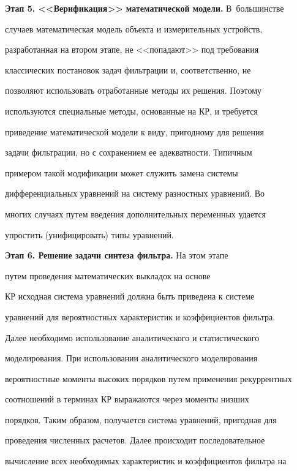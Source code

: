 \smallskip


\textbf{\bf Этап 5. <<Верификация>> математической модели.} В~большинстве


случаев математическая модель объекта и измерительных  устройств,


разработанная на втором этапе, не <<попадают>> под требования


классических постановок задач фильтрации и, соответственно, не


позволяют использовать отработанные методы их решения. Поэтому


используются специальные методы, основанные на КР,  и  требуется


приведение математической модели к виду, пригодному для решения


задачи фильтрации, но с сохранением ее адекватности. Типичным


примером такой модификации может служить замена системы


дифференциальных уравнений на систему разностных уравнений. Во


многих случаях путем введения дополнительных переменных удается


упростить (унифицировать) типы уравнений.





\smallskip


\textbf{Этап 6. Решение задачи синтеза фильтра.} На этом этапе 


путем проведения математических выкладок на основе


КР исходная система уравнений должна быть приведена к системе


уравнений для вероятностных характеристик и коэффициентов фильтра.


Далее необходимо  использование аналитического и статистического


моделирования. При использовании аналитического моделирования


вероятностные моменты высоких порядков путем применения рекуррентных


соотношений в терминах КР выражаются через моменты низших


порядков. Таким образом, получается система уравнений, пригодная для


проведения численных расчетов. Далее происходит последовательное


вы\-чис\-ле\-ние всех необходимых характеристик и коэффициентов фильтра на


